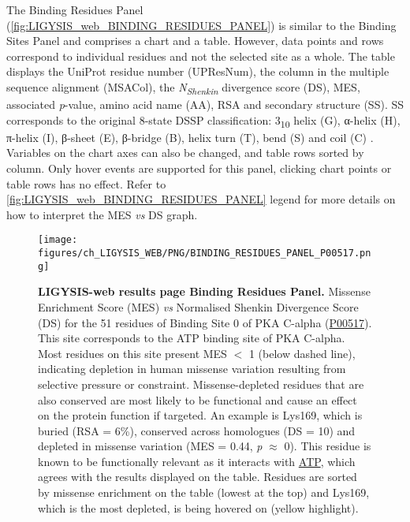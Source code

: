 The Binding Residues Panel (\autoref{fig:LIGYSIS_web_BINDING_RESIDUES_PANEL}) is similar to the Binding Sites Panel and comprises a chart and a table. However, data points and rows correspond to individual residues and not the selected site as a whole. The table displays the UniProt residue number (UPResNum), the column in the multiple sequence alignment (MSACol), the \textit{N\textsubscript{Shenkin}} divergence score (DS), MES, associated \textit{p}-value, amino acid name (AA), RSA and secondary structure (SS). SS corresponds to the original 8-state DSSP classification: 3\textsubscript{10} helix (G), α-helix (H), π-helix (I), β-sheet (E), β-bridge (B), helix turn (T), bend (S) and coil (C) \cite{KABSCH_1983_DSSP}. Variables on the chart axes can also be changed, and table rows sorted by column. Only hover events are supported for this panel, clicking chart points or table rows has no effect. Refer to \autoref{fig:LIGYSIS_web_BINDING_RESIDUES_PANEL} legend for more details on how to interpret the MES \textit{vs} DS graph.

\begin{figure}[htb!]
    \centering
    \texttt{[image: figures/ch\_LIGYSIS\_WEB/PNG/BINDING\_RESIDUES\_PANEL\_P00517.png]}
    \caption[LIGYSIS-web results page Binding Residues Panel]{\textbf{LIGYSIS-web results page Binding Residues Panel.} Missense Enrichment Score (MES) \textit{vs} Normalised Shenkin Divergence Score (DS) for the 51 residues of Binding Site 0 of PKA C-alpha (\href{https://www.uniprot.org/uniprotkb/P00517/entry}{P00517}). This site corresponds to the ATP binding site of PKA C-alpha. Most residues on this site present MES $<$ 1 (below dashed line), indicating depletion in human missense variation resulting from selective pressure or constraint. Missense-depleted residues that are also conserved are most likely to be functional and cause an effect on the protein function if targeted. An example is Lys169, which is buried (RSA = 6\%), conserved across homologues (DS = 10) and depleted in missense variation (MES = 0.44, \textit{p} $\approx$ 0). This residue is known to be functionally relevant as it interacts with \href{https://www.ebi.ac.uk/pdbe-srv/pdbechem/chemicalCompound/show/ATP}{ATP}, which agrees with the results displayed on the table. Residues are sorted by missense enrichment on the table (lowest at the top) and Lys169, which is the most depleted, is being hovered on (yellow highlight).}
    \label{fig:LIGYSIS_web_BINDING_RESIDUES_PANEL}
\end{figure}

